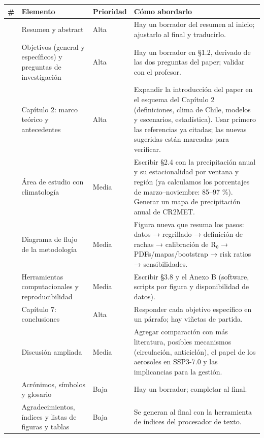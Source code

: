 {\def\LTcaptype{none} %
\begin{longtable}[]{@{}
  >{\raggedright\arraybackslash}p{}
  >{\raggedright\arraybackslash}p{}
  >{\raggedright\arraybackslash}p{}
  >{\raggedright\arraybackslash}p{}@{}}
\toprule\noalign{}
\begin{minipage}[b]{\linewidth}\raggedright
\#
\end{minipage} & \begin{minipage}[b]{\linewidth}\raggedright
Elemento
\end{minipage} & \begin{minipage}[b]{\linewidth}\raggedright
Prioridad
\end{minipage} & \begin{minipage}[b]{\linewidth}\raggedright
Cómo abordarlo
\end{minipage} \\
\midrule\noalign{}
\endhead
\bottomrule\noalign{}
\endlastfoot
1 & Resumen y abstract & Alta & Hay un borrador del resumen al inicio; ajustarlo al final y traducirlo. \\
2 & Objetivos (general y específicos) y preguntas de investigación & Alta & Hay un borrador en §1.2, derivado de las dos preguntas del paper; validar con el profesor. \\
3 & Capítulo 2: marco teórico y antecedentes & Alta & Expandir la introducción del paper en el esquema del Capítulo 2 (definiciones, clima de Chile, modelos y escenarios, estadística). Usar primero las referencias ya citadas; las nuevas sugeridas están marcadas para verificar. \\
4 & Área de estudio con climatología & Media & Escribir §2.4 con la precipitación anual y su estacionalidad por ventana y región (ya calculamos los porcentajes de marzo--noviembre: 85--97 \%). Generar un mapa de precipitación anual de CR2MET. \\
5 & Diagrama de flujo de la metodología & Media & Figura nueva que resuma los pasos: datos → regrillado → definición de rachas → calibración de R₀ → PDFs/mapas/bootstrap → risk ratios → sensibilidades. \\
6 & Herramientas computacionales y reproducibilidad & Media & Escribir §3.8 y el Anexo B (software, scripts por figura y disponibilidad de datos). \\
7 & Capítulo 7: conclusiones & Alta & Responder cada objetivo específico en un párrafo; hay viñetas de partida. \\
8 & Discusión ampliada & Media & Agregar comparación con más literatura, posibles mecanismos (circulación, anticiclón), el papel de los aerosoles en SSP3-7.0 y las implicancias para la gestión. \\
9 & Acrónimos, símbolos y glosario & Baja & Hay un borrador; completar al final. \\
10 & Agradecimientos, índices y listas de figuras y tablas & Baja & Se generan al final con la herramienta de índices del procesador de texto. \\
\end{longtable}
}

